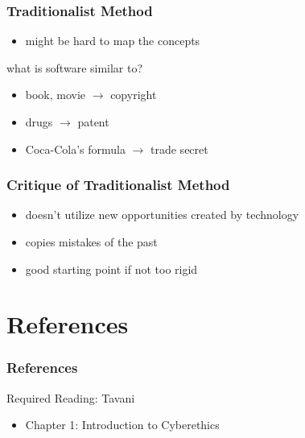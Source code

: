 \documentclass[dvipsnames]{beamer}
\begin{document}
\begin{frame}
  \frametitle{Traditionalist Method}

  \begin{itemize}
    \item might be hard to map the concepts
  \end{itemize}

  \begin{exampleblock}{what is software similar to?}
    \begin{itemize}
      \item book, movie $\rightarrow$ copyright
      \item drugs $\rightarrow$ patent
      \item Coca-Cola's formula $\rightarrow$ trade secret
    \end{itemize}
  \end{exampleblock}
\end{frame}

\begin{frame}
  \frametitle{Critique of Traditionalist Method}

  \begin{itemize}
    \item doesn't utilize new opportunities created by technology
    \item copies mistakes of the past

    \bigskip
    \item good starting point if not too rigid
  \end{itemize}
\end{frame}

\section*{References}

\begin{frame}
  \frametitle{References}

  \begin{block}{Required Reading: Tavani}
    \begin{itemize}
      \item Chapter 1: \alert{Introduction to Cyberethics}
    \end{itemize}
  \end{block}
\end{frame}
\end{document}
